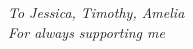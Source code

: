\begin{dedication}
    \centering \huge \itshape{}
    To Jessica, Timothy, Amelia\\
    For always supporting me
\end{dedication}

